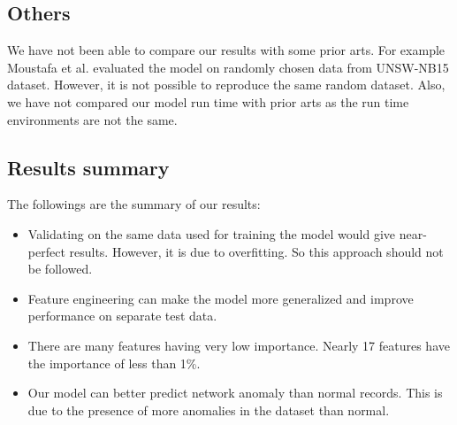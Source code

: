 \documentclass[14pt, conference]{IEEEtran}
\begin{document}
\subsection{Others}
We have not been able to compare our results with some prior arts. For example Moustafa et al. \cite{moustafa2017hybrid} \cite{moustafa2018anomaly} \cite{moustafa2019holistic} evaluated the model on randomly chosen data from UNSW-NB15 dataset. However, it is not possible to reproduce the same random dataset. Also, we have not compared our model run time with prior arts as the run time environments are not the same.



\subsection{Results summary}

The followings are the summary of our results:
\begin{itemize}
    \item Validating on the same data used for training the model would give near-perfect results. However, it is due to overfitting. So this approach should not be followed.
    \item Feature engineering can make the model more generalized and improve performance on separate test data.
    \item There are many features having very low importance. Nearly 17 features have the importance of less than 1\%.
    \item Our model can better predict network anomaly than normal records. This is due to the presence of more anomalies in the dataset than normal.
\end{itemize}
\end{document}
